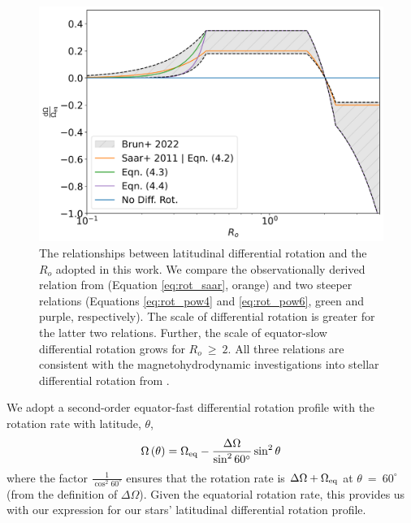 \begin{figure}
\centering
 \includegraphics[width=\textwidth]{Figures/rot_gap_figures/comparison_diffrot.png}
 \caption[The relationships between latitudinal differential rotation and the stellar $R_o$ adopted in this work.]{
 	The relationships between latitudinal differential rotation and the $R_o$ adopted in this work. We compare the observationally derived relation from \citet{saar_starspots_2011} (Equation \ref{eq:rot_saar}, orange) and two steeper relations (Equations \ref{eq:rot_pow4} and \ref{eq:rot_pow6}, green and purple, respectively). The scale of differential rotation is greater for the latter two relations. Further, the scale of equator-slow differential rotation grows for $R_o\ \geq \ 2$. All three relations are consistent with the magnetohydrodynamic investigations into stellar differential rotation from \citet{brun_powering_2022}.
}
 \label{fig:compar_diffrot}
\end{figure}

We adopt a second-order equator-fast differential rotation profile with the rotation rate with latitude, $\theta$,
\begin{equation}
 \label{eq:obs_eq}
 \Omega\left(\theta\right) = \Omega_{\rm{eq}} - \frac{\Delta \Omega}{\sin^2 60^{\circ}} \sin^2{\theta}
\end{equation}
where the factor $\frac{1}{\cos^2{60^{\circ}}}$ ensures that the rotation rate is $\Delta \Omega + \Omega_{\rm{eq}}$ at $\theta \ = \ 60^{\circ}$ (from the definition of $\Delta \Omega$).
Given the equatorial rotation rate, this provides us with our expression for our stars' latitudinal differential rotation profile.

